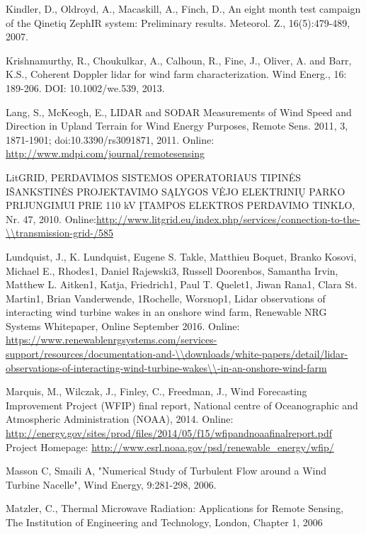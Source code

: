 Kindler, D., Oldroyd, A., Macaskill, A., Finch, D., An eight month test campaign of the Qinetiq ZephIR system:  Preliminary results. Meteorol. Z.,  16(5):479-489, 2007.


Krishnamurthy, R., Choukulkar, A., Calhoun, R., Fine, J., Oliver, A. and Barr, K.S., Coherent Doppler lidar for wind farm characterization. Wind Energ., 16: 189-206. DOI: 10.1002/we.539, 2013.


Lang, S., McKeogh, E., LIDAR and SODAR Measurements of Wind Speed and Direction in Upland Terrain for Wind Energy Purposes, Remote Sens. 2011, 3, 1871-1901; doi:10.3390/rs3091871, 2011. Online: \url{http://www.mdpi.com/journal/remotesensing}


LitGRID, PERDAVIMOS SISTEMOS OPERATORIAUS TIPINĖS IŠANKSTINĖS PROJEKTAVIMO SĄLYGOS VĖJO ELEKTRINIŲ PARKO PRIJUNGIMUI PRIE 110 kV ĮTAMPOS ELEKTROS PERDAVIMO TINKLO, Nr. 47, 2010.
Online:\url{http://www.litgrid.eu/index.php/services/connection-to-the-\\transmission-grid-/585}


Lundquist, J., K. Lundquist, Eugene S. Takle, Matthieu Boquet, Branko Kosovi, Michael E., Rhodes1, Daniel Rajewski3, Russell Doorenbos, Samantha Irvin, Matthew L. Aitken1, Katja, Friedrich1, Paul T. Quelet1, Jiwan 
Rana1, Clara St. Martin1, Brian Vanderwende, 1Rochelle, Worsnop1, Lidar observations of interacting wind turbine wakes in an onshore wind farm, Renewable NRG Systems Whitepaper, Online September 2016. 
Online:\\\small{\url{https://www.renewablenrgsystems.com/services-support/resources/documentation-and-\\downloads/white-papers/detail/lidar-observations-of-interacting-wind-turbine-wakes\\-in-an-onshore-wind-farm}}

Marquis, M., Wilczak, J., Finley, C., Freedman, J., Wind Forecasting Improvement Project (WFIP) final report, National centre of Oceanographic and Atmospheric Administration (NOAA), 2014. 
Online: \url{http://energy.gov/sites/prod/files/2014/05/f15/wfipandnoaafinalreport.pdf} Project Homepage:  
\url{http://www.esrl.noaa.gov/psd/renewable_energy/wfip/}


Masson C, Smaili A, "Numerical Study of Turbulent Flow around a Wind Turbine Nacelle", Wind Energy, 9:281-298, 2006.


Matzler, C., Thermal Microwave Radiation: Applications for Remote Sensing, The Institution of Engineering and Technology, London, Chapter 1, 2006

